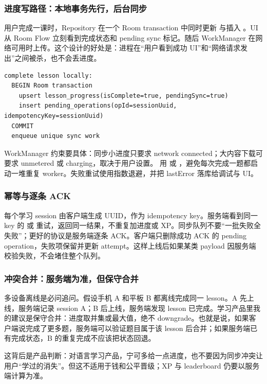 \subsubsection{进度写路径：本地事务先行，后台同步}

用户完成一课时，Repository 在一个 Room transaction 中同时更新  与插入 。UI 从 Room Flow 立刻看到完成状态和 pending sync 标记。随后 WorkManager 在网络可用时上传。这个设计的好处是：进程在“用户看到成功 UI”和“网络请求发出”之间被杀，也不会丢进度。

\begin{lstlisting}
complete lesson locally:
  BEGIN Room transaction
    upsert lesson_progress(isComplete=true, pendingSync=true)
    insert pending_operations(opId=sessionUuid, idempotencyKey=sessionUuid)
  COMMIT
  enqueue unique sync work
\end{lstlisting}

WorkManager 约束要具体：同步小进度只要求 network connected；大内容下载可要求 unmetered 或 charging，取决于用户设置。 用  或 ，避免每次完成一题都启动一堆重复 worker。失败重试使用指数退避，并把 lastError 落库给调试与 UI。

\subsubsection{幂等与逐条 ACK}

每个学习 session 由客户端生成 UUID，作为 idempotency key。服务端看到同一 key 的  或  重试，返回同一结果，不重复加进度或 XP。同步队列不要“一批失败全失败”；更好的协议是服务端逐条 ACK。客户端只删除成功 ACK 的 pending operation，失败项保留并更新 attempt。这样上线后如果某类 payload 因服务端校验失败，不会堵住整个队列。

\subsubsection{冲突合并：服务端为准，但保守合并}

多设备离线是必问追问。假设手机 A 和平板 B 都离线完成同一 lesson。A 先上线，服务端记录 session A；B 后上线，服务端发现 lesson 已完成。学习产品里我的建议是保守合并：进度取并集或最大值，绝不 downgrade。也就是说，如果客户端说完成了更多题，服务端可以验证题目属于该 lesson 后合并；如果服务端已有完成状态，B 的重复完成不应该把状态回退。

这背后是产品判断：\srcinferred 对语言学习产品，宁可多给一点进度，也不要因为同步冲突让用户“学过的消失”。但这不适用于钱和公平晋级；XP 与 leaderboard 仍要以服务端计算为准。

